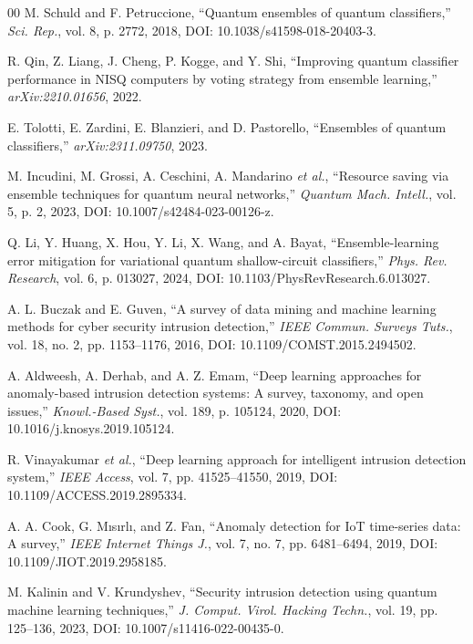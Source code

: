 \documentclass{ieeeaccess}
\begin{document}
\begin{thebibliography}{00}
 M. Schuld and F. Petruccione, ``Quantum ensembles of quantum classifiers,'' \emph{Sci. Rep.}, vol. 8, p. 2772, 2018, DOI: 10.1038/s41598-018-20403-3.

 R. Qin, Z. Liang, J. Cheng, P. Kogge, and Y. Shi, ``Improving quantum classifier performance in NISQ computers by voting strategy from ensemble learning,'' \emph{arXiv:2210.01656}, 2022.

 E. Tolotti, E. Zardini, E. Blanzieri, and D. Pastorello, ``Ensembles of quantum classifiers,'' \emph{arXiv:2311.09750}, 2023.

 M. Incudini, M. Grossi, A. Ceschini, A. Mandarino \emph{et al.}, ``Resource saving via ensemble techniques for quantum neural networks,'' \emph{Quantum Mach. Intell.}, vol. 5, p. 2, 2023, DOI: 10.1007/s42484-023-00126-z.

 Q. Li, Y. Huang, X. Hou, Y. Li, X. Wang, and A. Bayat, ``Ensemble-learning error mitigation for variational quantum shallow-circuit classifiers,'' \emph{Phys. Rev. Research}, vol. 6, p. 013027, 2024, DOI: 10.1103/PhysRevResearch.6.013027.

 A. L. Buczak and E. Guven, ``A survey of data mining and machine learning methods for cyber security intrusion detection,'' \emph{IEEE Commun. Surveys Tuts.}, vol. 18, no. 2, pp. 1153--1176, 2016, DOI: 10.1109/COMST.2015.2494502.

 A. Aldweesh, A. Derhab, and A. Z. Emam, ``Deep learning approaches for anomaly-based intrusion detection systems: A survey, taxonomy, and open issues,'' \emph{Knowl.-Based Syst.}, vol. 189, p. 105124, 2020, DOI: 10.1016/j.knosys.2019.105124.

 R. Vinayakumar \emph{et al.}, ``Deep learning approach for intelligent intrusion detection system,'' \emph{IEEE Access}, vol. 7, pp. 41525--41550, 2019, DOI: 10.1109/ACCESS.2019.2895334.

 A. A. Cook, G. M{\i}s{\i}rl{\i}, and Z. Fan, ``Anomaly detection for IoT time-series data: A survey,'' \emph{IEEE Internet Things J.}, vol. 7, no. 7, pp. 6481--6494, 2019, DOI: 10.1109/JIOT.2019.2958185.

 M. Kalinin and V. Krundyshev, ``Security intrusion detection using quantum machine learning techniques,'' \emph{J. Comput. Virol. Hacking Techn.}, vol. 19, pp. 125--136, 2023, DOI: 10.1007/s11416-022-00435-0.


\end{thebibliography}
\end{document}
